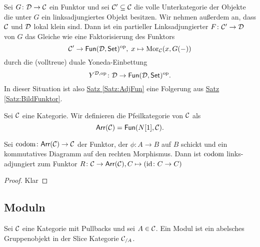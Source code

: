 \begin{Bem}
     Sei \(G\colon \mathcal{D}\to \mathcal{C}\) ein Funktor und sei \(\mathcal{C}'\subseteq \mathcal{C}\) die volle Unterkategorie der
 Objekte die unter \(G\) ein linksadjungiertes Objekt besitzen. Wir nehmen außerdem an, dass \(\mathcal{C}\)
 und \(\mathcal{D}\) lokal klein sind.
 Dann ist ein partieller Linksadjungierter \(F\colon\mathcal{C}'\to \mathcal{D}\) von \(G\) das Gleiche wie eine Faktorisierung des Funktors
 \[\mathcal{C}'\to\mathsf{Fun}(\mathcal{D},\mathsf{Set})^{\mathrm{op}},\; x\mapsto\operatorname{Mor}_{\mathcal{C}}(x,G(-))\]
 durch die (volltreue) duale Yoneda-Einbettung \[Y^{\mathcal{D},\mathrm{op}}\colon \mathcal{D}\to\mathsf{Fun}(\mathcal{D},\mathsf{Set})^{\mathrm{op}}.\] In dieser Situation
 ist also \hyperref[Satz:AdjFun]{Satz \ref{Satz:AdjFun}} eine Folgerung aus \hyperref[Satz:BildFunktor]{Satz \ref{Satz:BildFunktor}}.
\end{Bem}
\begin{Def}\label{Def:ArrowCat}
    Sei \(\mathcal{C}\) eine Kategorie. Wir definieren die Pfeilkategorie von \(\mathcal{C}\) als \[\mathsf{Arr}(\mathcal{C})=\mathsf{Fun}(N[1],\mathcal{C}).\]
\end{Def}
\begin{Lemma}\label{Lem:CodomAdj}
    Sei \(\operatorname{codom}\colon \mathsf{Arr}(\mathcal{C})\to \mathcal{C}\) der Funktor, der \(\phi\colon A\to B\) auf \(B\) schickt und ein kommutatives Diagramm auf den rechten Morphismus.
    Dann ist \(\operatorname{codom}\) links-adjungiert zum Funktor \(R\colon \mathcal{C}\to \mathsf{Arr}(\mathcal{C}), C\mapsto (\mathrm{id}\colon C\to C)\)
\end{Lemma}
\begin{proof}
    Klar
\end{proof}
\subsection{Moduln}
\begin{Def}
    Sei \(\mathcal{C}\) eine Kategorie mit Pullbacks und sei \(A\in\mathcal{C}\). Ein Modul ist ein abelsches Gruppenobjekt in der Slice Kategorie \(\mathcal{C}_{/A}\).
\end{Def}